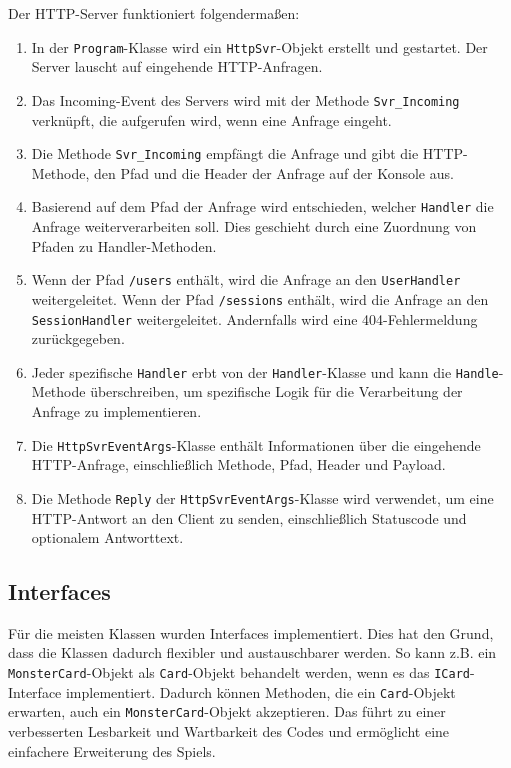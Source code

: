 \documentclass[a4paper, 12pt]{article}
\begin{document}
Der HTTP-Server funktioniert folgendermaßen:
\begin{enumerate}
    \item In der \texttt{Program}-Klasse wird ein \texttt{HttpSvr}-Objekt erstellt und gestartet. Der Server lauscht auf eingehende HTTP-Anfragen.
    \item Das Incoming-Event des Servers wird mit der Methode \texttt{Svr\_Incoming} verknüpft, die aufgerufen wird, wenn eine Anfrage eingeht.
    \item Die Methode \texttt{Svr\_Incoming} empfängt die Anfrage und gibt die HTTP-Methode, den Pfad und die Header der Anfrage auf der Konsole aus.
    \item Basierend auf dem Pfad der Anfrage wird entschieden, welcher \texttt{Handler} die Anfrage weiterverarbeiten soll. Dies geschieht durch eine Zuordnung von Pfaden zu Handler-Methoden.
    \item Wenn der Pfad \texttt{/users} enthält, wird die Anfrage an den \texttt{UserHandler} weitergeleitet. Wenn der Pfad \texttt{/sessions} enthält, wird die Anfrage an den \texttt{SessionHandler} weitergeleitet. Andernfalls wird eine 404-Fehlermeldung zurückgegeben.
    \item Jeder spezifische \texttt{Handler} erbt von der \texttt{Handler}-Klasse und kann die \texttt{Handle}-Methode überschreiben, um spezifische Logik für die Verarbeitung der Anfrage zu implementieren.
    \item Die \texttt{HttpSvrEventArgs}-Klasse enthält Informationen über die eingehende HTTP-Anfrage, einschließlich Methode, Pfad, Header und Payload.
    \item Die Methode \texttt{Reply} der \texttt{HttpSvrEventArgs}-Klasse wird verwendet, um eine HTTP-Antwort an den Client zu senden, einschließlich Statuscode und optionalem Antworttext.
\end{enumerate}

\subsection{Interfaces}
Für die meisten Klassen wurden Interfaces implementiert. Dies hat den Grund, dass die Klassen dadurch flexibler und austauschbarer werden. So kann z.B. ein \texttt{MonsterCard}-Objekt als \texttt{Card}-Objekt behandelt werden, wenn es das \texttt{ICard}-Interface implementiert. Dadurch können Methoden, die ein \texttt{Card}-Objekt erwarten, auch ein \texttt{MonsterCard}-Objekt akzeptieren.
Das führt zu einer verbesserten Lesbarkeit und Wartbarkeit des Codes und ermöglicht eine einfachere Erweiterung des Spiels.
\end{document}
